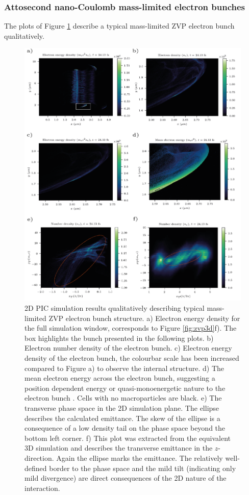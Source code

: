  \subsubsection{Attosecond nano-Coulomb mass-limited electron bunches}
 The plots of Figure \ref{fig:zvptypicalbunch} describe a typical mass-limited ZVP electron bunch qualitatively.
\begin{figure}
	\centering
	\includegraphics[width=1\linewidth]{figures/zvp/zvp_typical_bunch}
	\caption[2D PIC simulation results qualitatively describing typical mass-limited ZVP electron bunch structure.]{2D PIC simulation results qualitatively describing typical mass-limited ZVP electron bunch structure. a) Electron energy density for the full simulation window, corresponds to Figure \ref{fig:zvp3d}f). The box highlights the bunch presented in the following plots. b) Electron number density of the electron bunch. c) Electron energy density of the electron bunch, the colourbar scale has been increased compared to Figure a) to observe the internal structure. d) The mean electron energy across the electron bunch, suggesting a position dependent energy or quasi-monoenergetic nature to the electron bunch \cite{baevaZeroVectorPotential2011}. Cells with no macroparticles are black. e) The transverse phase space in the 2D simulation plane. The ellipse describes the calculated emittance. The skew of the ellipse is a consequence of a low density tail on the phase space beyond the bottom left corner. f) This plot was extracted from the equivalent 3D simulation and describes the transverse emittance in the $z$-direction. Again the ellipse marks the emittance. The relatively well-defined border to the phase space and the mild tilt (indicating only mild divergence) are direct consequences of the 2D nature of the interaction.}
	\label{fig:zvptypicalbunch}
\end{figure}
